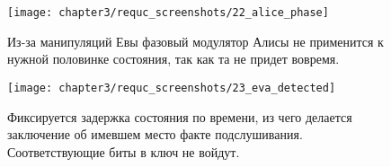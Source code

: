 \begin{figure}[h]
  \texttt{[image: chapter3/requc\_screenshots/22\_alice\_phase]}
  \caption{Из-за манипуляций Евы фазовый модулятор Алисы не применится к нужной половинке состояния, так как та не придет вовремя.}
\end{figure}

\begin{figure}[h]
  \texttt{[image: chapter3/requc\_screenshots/23\_eva\_detected]}
  \caption{Фиксируется задержка состояния по времени, из чего делается заключение об имевшем место факте подслушивания. Соответствующие биты в ключ не войдут.}
\end{figure}